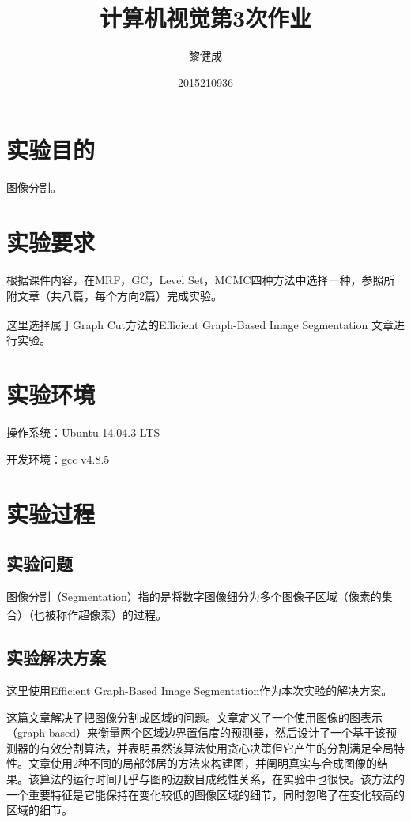 \documentclass[a4paper, 12pt, UTF8]{article}
\begin{document}
\title{计算机视觉第3次作业}
\author{黎健成}
\date{2015210936}
\maketitle

\section{实验目的}

图像分割。


\section{实验要求}

根据课件内容，在MRF，GC，Level Set，MCMC四种方法中选择一种，参照所附文章（共八篇，每个方向2篇）完成实验。

这里选择属于Graph Cut方法的Efficient Graph-Based Image Segmentation\textsuperscript{\cite{ref1}} 文章进行实验。

\section{实验环境}

操作系统：Ubuntu 14.04.3 LTS

开发环境：gcc v4.8.5


\section{实验过程}

\subsection{实验问题}

图像分割（Segmentation）指的是将数字图像细分为多个图像子区域（像素的集合）（也被称作超像素）的过程\textsuperscript{\cite{ref2}}。


\subsection{实验解决方案}

这里使用Efficient Graph-Based Image Segmentation作为本次实验的解决方案。

这篇文章解决了把图像分割成区域的问题。文章定义了一个使用图像的图表示（graph-based）来衡量两个区域边界置信度的预测器，然后设计了一个基于该预测器的有效分割算法，并表明虽然该算法使用贪心决策但它产生的分割满足全局特性。文章使用2种不同的局部邻居的方法来构建图，并阐明真实与合成图像的结果。该算法的运行时间几乎与图的边数目成线性关系，在实验中也很快。该方法的一个重要特征是它能保持在变化较低的图像区域的细节，同时忽略了在变化较高的区域的细节。
\end{document}
